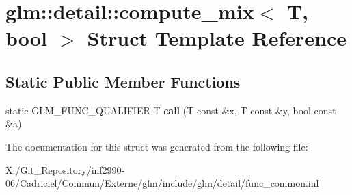 \hypertarget{structglm_1_1detail_1_1compute__mix_3_01_t_00_01bool_01_4}{\section{glm\-:\-:detail\-:\-:compute\-\_\-mix$<$ T, bool $>$ Struct Template Reference}
\label{structglm_1_1detail_1_1compute__mix_3_01_t_00_01bool_01_4}
}
\subsection*{Static Public Member Functions}
\begin{DoxyCompactItemize}
\item 
\hypertarget{structglm_1_1detail_1_1compute__mix_3_01_t_00_01bool_01_4_a7a83cf7bd102239b974faf18137d8c63}{static G\-L\-M\-\_\-\-F\-U\-N\-C\-\_\-\-Q\-U\-A\-L\-I\-F\-I\-E\-R T {\bfseries call} (T const \&x, T const \&y, bool const \&a)}\label{structglm_1_1detail_1_1compute__mix_3_01_t_00_01bool_01_4_a7a83cf7bd102239b974faf18137d8c63}

\end{DoxyCompactItemize}


The documentation for this struct was generated from the following file\-:\begin{DoxyCompactItemize}
\item 
X\-:/\-Git\-\_\-\-Repository/inf2990-\/06/\-Cadriciel/\-Commun/\-Externe/glm/include/glm/detail/func\-\_\-common.\-inl\end{DoxyCompactItemize}
